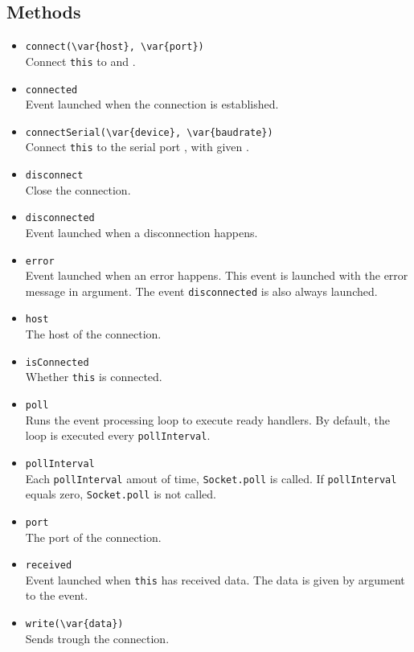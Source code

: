 \subsection{Methods}
\begin{itemize}

\item \lstinline|connect(\var{host}, \var{port})|\\
  Connect \lstinline|this| to  and .

\item \lstinline|connected|\\
  Event launched when the connection is established.

\item \lstinline|connectSerial(\var{device}, \var{baudrate})|\\
  Connect \lstinline|this| to the serial port , with given
  .

\item \lstinline|disconnect|\\
  Close the connection.

\item \lstinline|disconnected|\\
  Event launched when a disconnection happens.

\item \lstinline|error|\\
  Event launched when an error happens. This event is launched with
  the error message in argument. The event \lstinline|disconnected| is
  also always launched.

\item \lstinline|host|\\
  The host of the connection.

\item \lstinline|isConnected|\\
  Whether \lstinline|this| is connected.

\item \lstinline|poll|\\
  Runs the event processing loop to execute ready handlers. By
  default, the loop is executed every \lstinline|pollInterval|.

\item \lstinline|pollInterval|\\
  Each \lstinline|pollInterval| amout of time, \lstinline|Socket.poll|
  is called. If \lstinline|pollInterval| equals zero,
  \lstinline|Socket.poll| is not called.

\item \lstinline|port|\\
  The port of the connection.

\item \lstinline|received|\\
  Event launched when \lstinline|this| has received data. The data is
  given by argument to the event.

\item \lstinline|write(\var{data})|\\
  Sends  trough the connection.

\end{itemize}
